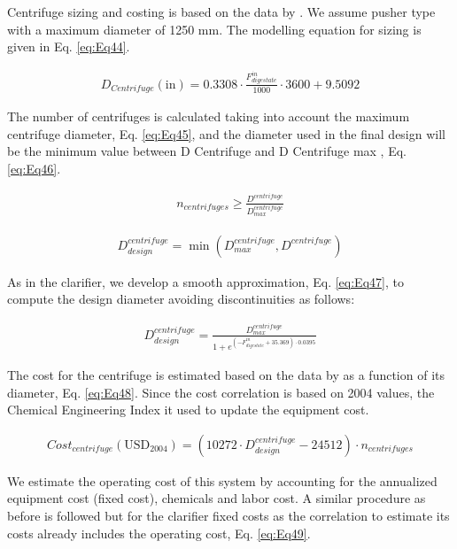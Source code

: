 \begin{refsection}[referencesCh2]
Centrifuge sizing and costing is based on the data by \citet{green2008perry}. We assume pusher type with a maximum diameter of 1250 mm. The modelling equation for sizing is given in Eq. \ref{eq:Eq44}.

\begin{align}
	D_{Centrifuge}\left( \text{in} \right) = 0.3308 \cdot \frac{F_{digestate}^{in}}{1000}\cdot 3600 + 9.5092 \label{eq:Eq44}
\end{align}

The number of centrifuges is calculated taking into account the maximum centrifuge diameter, Eq. \ref{eq:Eq45}, and the diameter used in the ﬁnal design will be the minimum value between D Centrifuge and D Centrifuge max , Eq. \ref{eq:Eq46}.

\begin{align}
	{n}_{centrifuges} \ge \frac{D^{centrifuge}}{D_{max}^{centrifuge}} \label{eq:Eq45}
\end{align}

\begin{align}
	D_{design}^{centrifuge} = \min \left( {D_{max}^{centrifuge}, D^{centrifuge}} \right) \label{eq:Eq46}
\end{align}

As in the clarifier, we develop a smooth approximation, Eq. \ref{eq:Eq47}, to compute the design diameter avoiding discontinuities as follows:

\begin{align}
	D_{design}^{centrifuge} = \frac{D_{max}^{centrifuge}}{1 + {e^{\left( { -F_{digestate}^{in} + 35.369} \right) \cdot 0.0395}}} \label{eq:Eq47}
\end{align}

The cost for the centrifuge is estimated based on the data by \citet{green2008perry} as a function of its diameter, Eq. \ref{eq:Eq48}. Since the cost correlation is based on 2004 values, the Chemical Engineering Index it used to update the equipment cost.

\begin{align}
	Cost_{centrifuge}\left( \text{USD}_{2004}  \right) = \left( {10272 \cdot D_{design}^{centrifuge} - 24512} \right) \cdot {n}_{centrifuges} \label{eq:Eq48}
\end{align}

We estimate the operating cost of this system by accounting for the annualized equipment cost (fixed cost), chemicals and labor cost. A similar procedure as before is followed \citep{vian1975pronostico} but for the clarifier fixed costs as the correlation to estimate its costs already includes the operating cost, Eq. \ref{eq:Eq49}.


\end{refsection}
